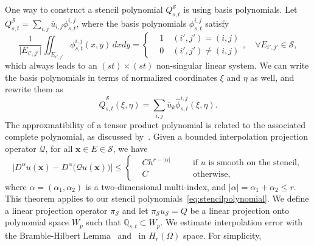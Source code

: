 One way to construct a stencil polynomial $Q^\mathcal{S}_{s,t}$ is using basis polynomials.
Let 
$Q^{\mathcal{S}}_{s,t} = \sum_{i,j} \overline{u}_{i,j} \phi^{i,j}_{s,t}$,
where the basis polynomials $\phi^{i,j}_{s,t}$ satisfy
\begin{equation}\label{eq:basispoly}
		  \frac{1}{\lvert E_{i',j'}\rvert } \iint_{E_{i',j'}} \phi^{i,j}_{s,t} (x,y)\, dxdy = 
		  \left \{
					 \begin{aligned}
								&1 \quad  (i',j') = (i,j)\\
								&0 \quad  (i',j') \neq (i,j)
					 \end{aligned}
					 \right. 
					 ,\quad \forall E_{i',j'} \in \mathcal{S},
\end{equation}
which always leads to an $(s t) \times (s t)$ non-singular linear system.
We can write the basis polynomials in terms of normalized coordinates $\xi$ and $\eta$ as well, and
rewrite them as
\begin{equation}\label{eq:normalizedstencilpoly}
\hat{Q}^{\mathcal{S}}_{s,t}(\xi, \eta) = \sum_{i,j} \overline{u}_k \hat{\phi}_{s,t}^{i,j}(\xi, \eta).
\end{equation}
The approxmatibility of a tensor product polynomial is related to the associated complete polynomial, 
as discussed by~\cite{ddd3654d-28ed-3763-8d70-a82ea44a3d31}.
Given a bounded interpolation projection operator $\mathcal{Q}$, for all $\mathbf{x} \in E \in \mathcal{S}$, we have
\begin{equation}
\lvert D^\alpha u(\mathbf{x}) - D^\alpha \big(\mathcal{Q} u(\mathbf{x})\big) \rvert \leq \left \{ 
\begin{alignedat}{2}
&C h^{r-\lvert \alpha \rvert}  \quad && \text{if $u$ is smooth on the stencil},\\
&C && \text{otherwise},
\end{alignedat}
		  \right.
\end{equation}
where $\alpha = (\alpha_1, \alpha_2)$ is a two-dimensional multi-index, and $\lvert \alpha \rvert = \alpha_1 + \alpha_2 \leq r$.
This theorem applies to our stencil polynomials~\eqref{eq:stencilpolynomial}.
\iffalse
We define a linear projection operator $\pi_\mathcal{S}$ and let $\pi_\mathcal{S} u_\mathcal{S} = Q$ be a linear 
projection onto polynomial space $W_p$ such that $\mathbb{Q}_{s,t} \subset W_p$.
We estimate interpolation error with the Bramble-Hilbert Lemma~\cite{ddd3654d-28ed-3763-8d70-a82ea44a3d31} 
and~\cite{EstimationofLinearFunctionals} in $H_r(\Omega)$ space. For simplicity,
